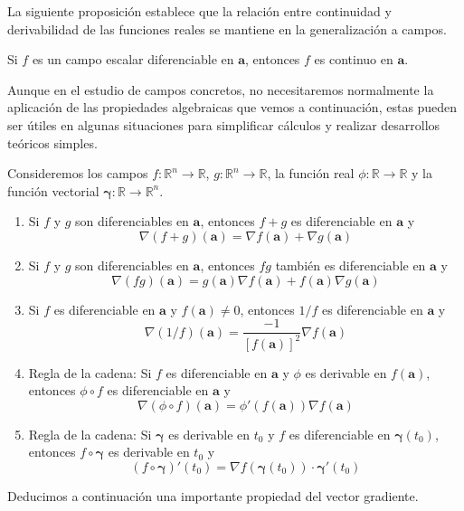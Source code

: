 La siguiente proposición establece que la relación entre continuidad y derivabilidad de las funciones reales se mantiene en la generalización a campos.
%
\begin{proposicion} Si $f$ es un campo escalar diferenciable en $\boldsymbol{a}$, entonces $f$ es continuo en $\boldsymbol{a}$.
\end{proposicion}
%
Aunque en el estudio de campos concretos, no necesitaremos normalmente la aplicación de las propiedades algebraicas que vemos a continuación, estas pueden ser útiles en algunas situaciones para simplificar cálculos y realizar desarrollos teóricos simples.

\begin{proposicion}\label{prop-alg} Consideremos los campos $f\colon\mathbb{R}^n\to\mathbb{R}$, $g\colon\mathbb{R}^n\to\mathbb{R}$, la función real $\phi\colon\mathbb{R}\to\mathbb{R}$ y la función vectorial $\boldsymbol\gamma\colon\mathbb{R}\to\mathbb{R}^n$.
\begin{enumerate}
\item
Si $f$ y $g$ son diferenciables en $\boldsymbol{a}$, entonces $f+g$ es diferenciable en $\boldsymbol{a}$ y
\[
\nabla(f+g)(\boldsymbol{a})=\nabla f(\boldsymbol{a})+\nabla g(\boldsymbol{a})
\]
\item
Si $f$ y $g$ son diferenciables en $\boldsymbol{a}$, entonces $fg$ también es diferenciable en $\boldsymbol{a}$ y
\[
\nabla(fg)(\boldsymbol{a})=g(\boldsymbol{a})\nabla f(\boldsymbol{a})+f(\boldsymbol{a})\nabla g(\boldsymbol{a})
\]
\item Si $f$ es diferenciable en $\boldsymbol{a}$ y $f(\boldsymbol{a})\neq 0$, entonces $1/f$ es diferenciable en $\boldsymbol{a}$ y
\[
\nabla(1/f)(\boldsymbol{a})=\frac{-1}{[f(\boldsymbol{a})]^2}\nabla f(\boldsymbol{a})
\]
\item
Regla de la cadena: Si $f$ es diferenciable en $\boldsymbol{a}$ y $\phi$ es derivable en $f(\boldsymbol{a})$, entonces $\phi\circ f$ es diferenciable en $\boldsymbol{a}$ y 
\[
\nabla(\phi\circ f)(\boldsymbol a)=\phi'(f(\boldsymbol{a}))\nabla f(\boldsymbol a)
\]
\item
Regla de la cadena: Si $\boldsymbol\gamma$ es derivable en $t_0$ y $f$ es diferenciable en $\boldsymbol\gamma(t_0)$, entonces $f\circ \boldsymbol\gamma$ es derivable en $t_0$ y 
\[
(f\circ \boldsymbol\gamma)'(t_0)=\nabla f(\boldsymbol\gamma(t_0))\cdot
\boldsymbol\gamma'(t_0)
\]
\end{enumerate}
\end{proposicion}
%
Deducimos a continuación una importante propiedad del vector gradiente.
